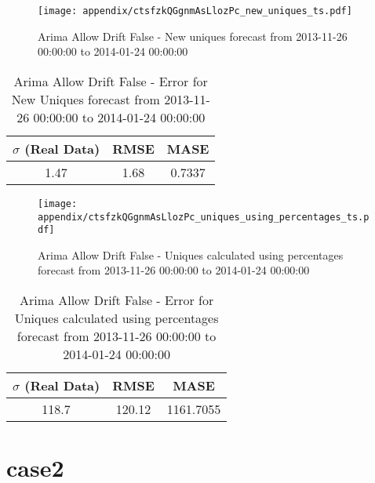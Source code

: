 \begin{figure}[H] \begin{center} \leavevmode
\texttt{[image: appendix/ctsfzkQGgnmAsLlozPc\_new\_uniques\_ts.pdf]} \caption{
Arima Allow Drift False - New uniques forecast from 2013-11-26 00:00:00 to 2014-01-24 00:00:00} \label{fig:appendix/ctsfzkQGgnmAsLlozPc_new_uniques_ts.pdf} \end{center}
\end{figure}

\begin{table}[H]
\centering
\footnotesize
\begin{tabular}{ccc}
$\sigma$ (Real Data) & RMSE & MASE   \\ \hline
1.47 & 1.68 & 0.7337 \\
\end{tabular}

\vspace{0.5cm}

\caption{
Arima Allow Drift False - Error for New Uniques forecast from 2013-11-26 00:00:00 to 2014-01-24 00:00:00}
\end{table}

\begin{figure}[H] \begin{center} \leavevmode
\texttt{[image: appendix/ctsfzkQGgnmAsLlozPc\_uniques\_using\_percentages\_ts.pdf]} \caption{
Arima Allow Drift False - Uniques calculated using percentages forecast from 2013-11-26 00:00:00 to 2014-01-24 00:00:00} \label{fig:appendix/ctsfzkQGgnmAsLlozPc_uniques_using_percentages_ts.pdf} \end{center}
\end{figure}

\begin{table}[H]
\centering
\footnotesize
\begin{tabular}{ccc}
$\sigma$ (Real Data) & RMSE & MASE   \\ \hline
118.7 & 120.12 & 1161.7055 \\
\end{tabular}

\vspace{0.5cm}

\caption{
Arima Allow Drift False - Error for Uniques calculated using percentages forecast from 2013-11-26 00:00:00 to 2014-01-24 00:00:00}
\end{table}

\chapter{case2}

